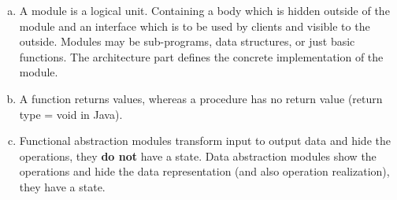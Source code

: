 \documentclass[a4paper,10pt]{scrartcl}[2003/01/01]
\begin{document}
\begin{enumerate}[a)]
		\item A module is a logical unit. Containing a body which is hidden outside of the module and an interface which is to be used by clients and visible to the outside. Modules may be sub-programs, data structures, or just basic functions. The architecture part defines the concrete implementation of the module.
		\item A function returns values, whereas a procedure has no return value (return type = void in Java).
		\item Functional abstraction modules transform input to output data and hide the operations, they \textbf{do not} have a state. Data abstraction modules show the operations and hide the data representation (and also operation realization), they have a state.
	\end{enumerate}
\end{document}
